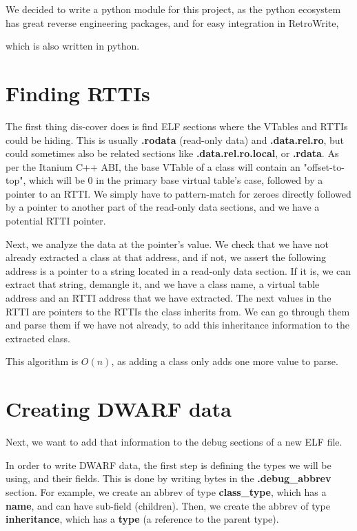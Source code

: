 \documentclass[a4paper,11pt,oneside]{report}
\begin{document}

We decided to write a python module for this project, as the python ecosystem 
has great reverse engineering packages, and for easy integration in RetroWrite, 


which is also written in python.

\section{Finding RTTIs}

The first thing dis-cover does is find ELF sections where the VTables and RTTIs 
could be hiding.
This is usually \textbf{.rodata} (read-only data) and \textbf{.data.rel.ro}, 
but could sometimes also be related sections like \textbf{.data.rel.ro.local}, 
or \textbf{.rdata}.
As per the Itanium C++ ABI, the base VTable of a class will contain an 
"offset-to-top", which will be 0 in the primary base virtual table's case, 
followed by a pointer to an RTTI.
We simply have to pattern-match for zeroes directly followed by a pointer to 
another part of the read-only data sections, and we have a potential RTTI 
pointer.

Next, we analyze the data at the pointer's value.
We check that we have not already extracted a class at that address, and if
not, we assert the following address is a pointer to a string located in a
read-only data section.
If it is, we can extract that string, demangle it, and we have a class name,
a virtual table address and an RTTI address that we have extracted.
The next values in the RTTI are pointers to the RTTIs the class inherits from.
We can go through them and parse them if we have not already, to add this 
inheritance information to the extracted class.

This algorithm is $O(n)$, as adding a class only adds one more value to parse.

\section{Creating DWARF data}

Next, we want to add that information to the debug sections of a new ELF file.

In order to write DWARF data, the first step is defining the types we will be 
using, and their fields.
This is done by writing bytes in the \textbf{.debug\_abbrev} section.
For example, we create an abbrev of type \textbf{class\_type}, which has a 
\textbf{name}, and can have sub-field (children).
Then, we create the abbrev of type \textbf{inheritance}, which has a 
\textbf{type} (a reference to the parent type).
\end{document}
